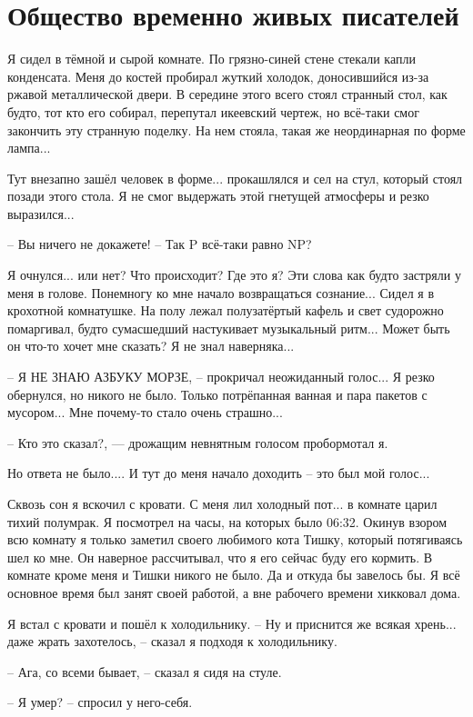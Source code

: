 \section{Общество временно живых писателей}

\asterisks
Я сидел в тёмной и сырой комнате. По грязно-синей стене стекали капли конденсата. Меня до костей пробирал жуткий холодок, доносившийся из-за ржавой металлической двери. В середине этого всего стоял странный стол, как будто, тот кто его собирал, перепутал икеевский чертеж, но всё-таки смог закончить эту странную поделку. На нем стояла, такая же неординарная по форме лампа...

Тут внезапно зашёл человек в форме... прокашлялся и сел на стул, который стоял позади этого стола. Я не смог выдержать этой гнетущей атмосферы и резко выразился...

-- Вы ничего не докажете!
-- Так P всё-таки равно NP?

\asterisks
Я очнулся... или нет? Что происходит? Где это я? Эти слова как будто застряли у меня в голове. Понемногу ко мне начало возвращаться сознание... Сидел я в крохотной комнатушке. На полу лежал полузатёртый кафель и свет судорожно помаргивал, будто сумасшедший настукивает музыкальный ритм... Может быть он что-то хочет мне сказать? Я не знал наверняка...

-- Я НЕ ЗНАЮ АЗБУКУ МОРЗЕ, -- прокричал неожиданный голос...
Я резко обернулся, но никого не было. Только потрёпанная ванная и пара пакетов с мусором... Мне почему-то стало очень страшно...

-- Кто это сказал?, — дрожащим невнятным голосом пробормотал я.

Но ответа не было.... И тут до меня начало доходить -- это был мой голос...

Сквозь сон я вскочил с кровати. С меня лил холодный пот... в комнате царил тихий полумрак. Я посмотрел на часы, на которых было 06:32. Окинув взором всю комнату я только заметил своего любимого кота Тишку, который потягиваясь шел ко мне. Он наверное рассчитывал, что я его сейчас буду его кормить. В комнате кроме меня и Тишки никого не было. Да и откуда бы завелось бы. Я всё основное время был занят своей работой, а вне рабочего времени хикковал дома.

Я встал с кровати и пошёл к холодильнику.
-- Ну и приснится же всякая хрень... даже жрать захотелось, -- сказал я подходя к холодильнику.

-- Ага, со всеми бывает, -- сказал я сидя на стуле.

-- Я умер? -- спросил у него-себя.


